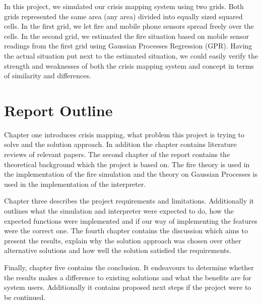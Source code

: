 In this project, we simulated our crisis mapping system using two grids. Both grids represented the same area (any area) divided into equally sized squared cells. In the first grid, we let fire and mobile phone sensors spread freely over the cells. In the second grid, we estimated the fire situation based on mobile sensor readings from the first grid using Gaussian Processes Regression (GPR). Having the actual situation put next to the estimated situation, we could easily verify the strength and weaknesses of both the crisis mapping system and concept in terms of similarity and differences.

\section{Report Outline}

Chapter one introduces crisis mapping, what problem this project is trying to solve and the solution approach. In addition the chapter contains literature reviews of relevant papers. The second chapter of the report contains the theoretical background which the project is based on. The fire theory is used in the implementation of the fire simulation and the theory on Gaussian Processes is used in the implementation of the interpreter.

Chapter three describes the project requirements and limitations. Additionally it outlines what the simulation and interpreter were expected to do, how the expected functions were implemented and if our way of implementing the features were the correct one. The fourth chapter contains the discussion which aims to present the results, explain why the solution approach was chosen over other alternative solutions and how well the solution satisfied the requirements.

Finally, chapter five contains the conclusion. It endeavours to determine whether the results makes a difference to existing solutions and what the benefits are for system users. Additionally it contains proposed next steps if the project were to be continued.